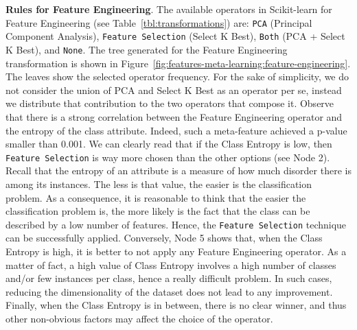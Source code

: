 \begin{example}
\textbf{Rules for Feature Engineering}. The available operators in Scikit-learn for Feature Engineering (see Table~\ref{tbl:transformations}) are: \texttt{PCA} (Principal Component Analysis), \texttt{Feature Selection} (Select K Best), \texttt{Both} (PCA + Select K Best), and \texttt{None}. The tree generated for the Feature Engineering transformation is shown in Figure~\ref{fig:features-meta-learning:feature-engineering}. The leaves show the selected operator frequency. For the sake of simplicity, we do not consider the union of PCA and Select K Best as an operator per se, instead we distribute that contribution to the two operators that compose it.
Observe that there is a strong correlation between the Feature Engineering operator and the entropy of the class attribute.
Indeed, such a meta-feature achieved a p-value smaller than 0.001.
We can clearly read that if the Class Entropy is low, then \texttt{Feature Selection} is way more chosen than the other options (see Node 2).
Recall that the entropy of an attribute is a measure of how much disorder there is among its instances.
The less is that value, the easier is the classification problem.
As a consequence, it is reasonable to think that the easier the classification problem is, the more likely is the fact that the class can be described by a low number of features.
Hence, the \texttt{Feature Selection} technique can be successfully applied.
Conversely, Node 5 shows that, when the Class Entropy is high, it is better to not apply any Feature Engineering operator.
As a matter of fact, a high value of Class Entropy involves a high number of classes and/or few instances per class, hence a really difficult problem.
In such cases, reducing the dimensionality of the dataset does not lead to any improvement.
Finally, when the Class Entropy is in between, there is no clear winner, and thus other non-obvious factors may affect the choice of the operator.


\end{example}
